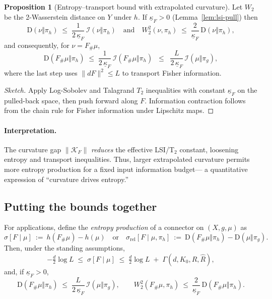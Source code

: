 \documentclass{article}
\theoremstyle{definition}
\newtheorem{proposition}[theorem]{Proposition}
\begin{document}
\begin{proposition}[Entropy--transport bound with extrapolated curvature]
\label{prop:lsi-talagrand}
Let \(W_2\) be the 2-Wasserstein distance on \(Y\) under \(h\).
If \(\underline\kappa_F>0\) (Lemma~\ref{lem:lsi-pull}) then
\[
\mathrm{D}(\nu\Vert \pi_h)
\;\le\; \frac{1}{2\,\underline\kappa_F}\, \mathcal{I}(\nu\Vert \pi_h)
\quad\text{and}\quad
W_2^2(\nu,\pi_h) \;\le\; \frac{2}{\underline\kappa_F}\,\mathrm{D}(\nu\Vert \pi_h),
\]
and consequently, for \(\nu=F_\#\mu\),
\[
\mathrm{D}(F_\#\mu\Vert \pi_h)
\;\le\; \frac{1}{2\,\underline\kappa_F}\, \mathcal{I}(F_\#\mu\Vert \pi_h)
\;\;\le\;\; \frac{L}{2\,\underline\kappa_F}\, \mathcal{I}(\mu\Vert \pi_g),
\]
where the last step uses \(\|dF\|^2\le L\) to transport Fisher information.
\end{proposition}

\begin{proof}[Sketch]
Apply Log-Sobolev and Talagrand \(T_2\) inequalities with constant
\(\underline\kappa_F\) on the pulled-back space, then push forward along \(F\).
Information contraction follows from the chain rule for Fisher information under
Lipschitz maps.
\end{proof}

\paragraph{Interpretation.}
The curvature gap \(\|\mathcal{K}_F\|\) \emph{reduces} the effective LSI/T\(_2\)
constant, loosening entropy and transport inequalities. Thus, larger extrapolated
curvature permits more entropy production for a fixed input information budget—
a quantitative expression of ``curvature drives entropy.''

\subsection{Putting the bounds together}

For applications, define the \emph{entropy production} of a connector on
\((X,g,\mu)\) as
\[
\sigma[F\mid \mu]\ :=\ h(F_\#\mu)-h(\mu)
\quad\text{or}\quad
\sigma_{\mathrm{rel}}[F\mid \mu,\pi_h]\ :=\ \mathrm{D}(F_\#\mu\Vert \pi_h)-\mathrm{D}(\mu\Vert \pi_g).
\]
Then, under the standing assumptions,
\begin{equation}\label{eq:master-bound}
-\tfrac{d}{2}\log L \;\le\; \sigma[F\mid \mu]
\;\le\; \tfrac{d}{2}\log L \;+\; \Gamma(d,K_0,R,\widehat R),
\end{equation}
and, if \(\underline\kappa_F>0\),
\begin{equation}\label{eq:lsi-bound}
\mathrm{D}(F_\#\mu\Vert \pi_h)
\;\le\; \frac{L}{2\,\underline\kappa_F}\, \mathcal{I}(\mu\Vert \pi_g),
\qquad
W_2^2(F_\#\mu,\pi_h)\ \le\ \frac{2}{\underline\kappa_F}\,\mathrm{D}(F_\#\mu\Vert \pi_h).
\end{equation}
\end{document}
